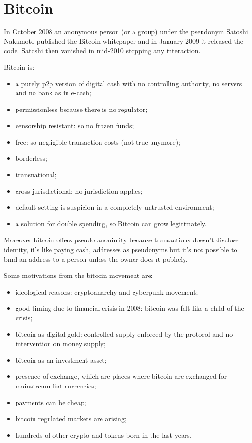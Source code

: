 \section{Bitcoin}
In October 2008 an anonymous person (or a group) under the pseudonym Satoshi Nakamoto published the Bitcoin whitepaper and in January 2009 it released the code.
Satoshi then vanished in mid-2010 stopping any interaction.

Bitcoin is:
\begin{itemize}
    \item a purely p2p version of digital cash with no controlling authority, no servers and no bank as in e-cash;
    \item permissionless because there is no regulator;
    \item censorship resistant: so no frozen funds;
    \item free: so negligible transaction costs (not true anymore);
    \item borderless;
    \item transnational;
    \item cross-jurisdictional: no jurisdiction applies;
    \item default setting is suspicion in a completely untrusted environment;
    \item a solution for double spending, so Bitcoin can grow legitimately.
\end{itemize}

Moreover bitcoin offers pseudo anonimity because transactions doesn't disclose identity, it's like paying cash, addresses as pseudonyms but it's not possible to bind an address to a person unless the owner does it publicly.

Some motivations from the bitcoin movement are:
\begin{itemize}
    \item ideological reasons: cryptoanarchy and cyberpunk movement;
    \item good timing due to financial crisis in 2008: bitcoin was felt like a child of the crisis;
    \item bitcoin as digital gold: controlled supply enforced by the protocol and no intervention on money supply;
    \item bitcoin as an investment asset;
    \item presence of exchange, which are places where bitcoin are exchanged for mainstream fiat currencies;
    \item payments can be cheap;
    \item bitcoin regulated markets are arising;
    \item hundreds of other crypto and tokens born in the last years.
\end{itemize}

